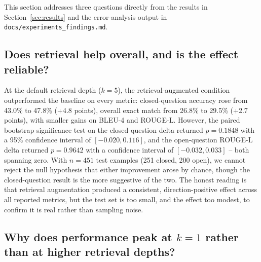 
This section addresses three questions directly from the results in
Section~\ref{sec:results} and the error-analysis output in
\texttt{docs/experiments\_findings.md}.

\subsection{Does retrieval help overall, and is the effect reliable?}

At the default retrieval depth ($k=5$), the retrieval-augmented condition
outperformed the baseline on every metric: closed-question accuracy rose
from 43.0\% to 47.8\% (+4.8 points), overall exact match from 26.8\% to
29.5\% (+2.7 points), with smaller gains on BLEU-4 and ROUGE-L. However,
the paired bootstrap significance test on the closed-question delta
returned $p = 0.1848$ with a 95\% confidence interval of $[-0.020, 0.116]$,
and the open-question ROUGE-L delta returned $p = 0.9642$ with a
confidence interval of $[-0.032, 0.033]$ -- both spanning zero. With
$n = 451$ test examples (251 closed, 200 open), we cannot reject the null
hypothesis that either improvement arose by chance, though the
closed-question result is the more suggestive of the two. The honest
reading is that retrieval augmentation produced a consistent,
direction-positive effect across all reported metrics, but the test set
is too small, and the effect too modest, to confirm it is real rather
than sampling noise.

\subsection{Why does performance peak at $k=1$ rather than at higher retrieval depths?}


